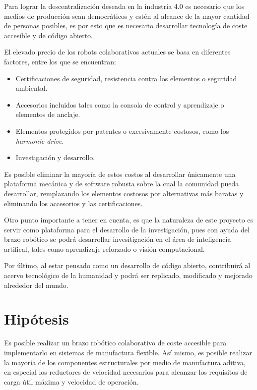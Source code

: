 Para lograr la descentralización deseada en la industria 4.0 es necesario que los medios de producción sean democráticos y estén al alcance de la mayor cantidad de personas posibles, es por esto que es necesario desarrollar tecnología de coste accesible y de código abierto.

El elevado precio de los robots colaborativos actuales se basa en diferentes factores, entre los que se encuentran:

\begin{itemize}
\itemsep0em 
\item Certificaciones de seguridad, resistencia contra los elementos o seguridad ambiental.
\item Accesorios incluidos tales como la consola de control y aprendizaje o elementos de anclaje.
\item Elementos protegidos por patentes o excesivamente costosos, como los \textit{harmonic drive}.
\item Investigación y desarrollo.
\end{itemize}

Es posible eliminar la mayoría de estos costos al desarrollar únicamente una plataforma mecánica y de software robusta sobre la cual la comunidad pueda desarrollar, remplazando los elementos costosos por alternativas más baratas y eliminando los accesorios y las certificaciones.

Otro punto importante a tener en cuenta, es que la naturaleza de este proyecto es servir como plataforma para el desarrollo de la investigación, pues con ayuda del brazo robótico se podrá desarrollar invesitigación en el área de inteligencia artifical, tales como aprendizaje reforzado o visión computacional.

Por último, al estar pensado como un desarrollo de código abierto, contribuirá al acervo tecnológico de la humanidad y podrá ser replicado, modificado y mejorado alrededor del mundo. 


\section{Hipótesis}

Es posible realizar un brazo robótico colaborativo de coste accesible para implementarlo en sistemas de manufactura flexible. Así mismo, es posible realizar la mayoría de los componentes estructurales por medio de manufactura aditiva, en especial los reductores de velocidad necesarios para alcanzar los requisitos de carga útil máxima y velocidad de operación.

